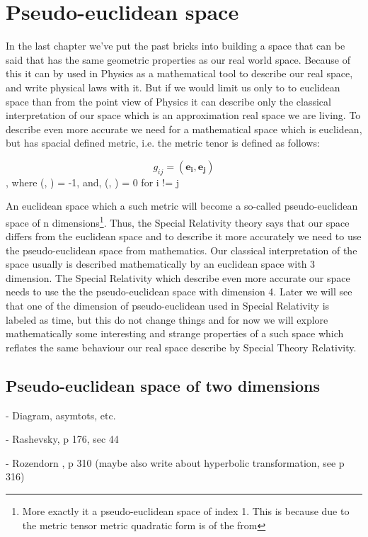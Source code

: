 \documentclass{book}
\begin{document}
\chapter{Pseudo-euclidean space}

In the last chapter we've put the past bricks into building a space that can be said that has the same geometric properties as our real world space. Because of this it can by used in Physics as a mathematical tool to describe our real space, and write physical laws with it. But if we would limit us only to to euclidean space than from the point view of Physics it can describe only the classical interpretation of our space which is an approximation real space we are living. To describe even more accurate we need for a mathematical space which is euclidean, but has spacial defined metric, i.e. the metric tenor is defined as follows:

\[g_{ij} = (\boldsymbol{e_i}, \boldsymbol{e_j})\], where (, ) = -1, and, (, ) = 0 for {i != j} \]

An euclidean space which a such metric will become a so-called pseudo-euclidean space of n dimensions\footnote{More exactly it a pseudo-euclidean space of index 1. This is because due to the metric tensor metric quadratic form is of the from }. Thus, the Special Relativity theory says that our space differs from the euclidean space and to describe it more accurately we need to use the pseudo-euclidean space from mathematics. Our classical interpretation of the space usually is described mathematically by an euclidean  space with 3 dimension. The Special Relativity which describe even more accurate our space needs to use the the pseudo-euclidean space with dimension 4. Later we will see that one of the dimension of pseudo-euclidean used in Special Relativity is labeled as time, but this do not change things and for now we will explore mathematically some interesting and strange properties of a such space which reflates the same behaviour our real space describe by Special Theory Relativity.

\section{Pseudo-euclidean space of two dimensions}

- Diagram, asymtots, etc.

- Rashevsky, p 176, sec 44

- Rozendorn , p 310 (maybe also write about hyperbolic transformation, see p 316)
\end{document}
